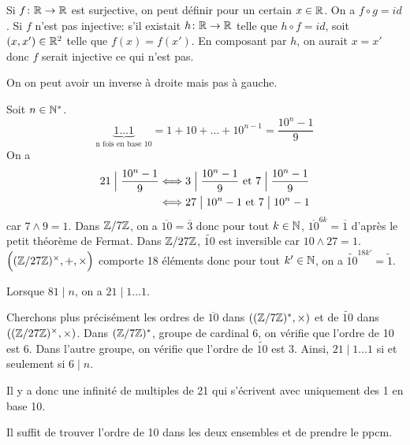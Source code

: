 \begin{remark}
	Si $f\colon\mathbb{R}\to\mathbb{R}$ est surjective, on peut définir  pour un certain $x\in\mathbb{R}$. On a $f\circ g=id$. Si $f$ n'est pas injective: s'il existait $h\colon\mathbb{R}\to\mathbb{R}$ telle que $h\circ f=id$, soit $(x,x')\in \mathbb{R}^{2}$ telle que $f(x)=f(x')$. En composant par $h$, on aurait $x=x'$ donc $f$ serait injective ce qui n'est pas. 

	On on peut avoir un inverse à droite mais pas à gauche.
\end{remark}

\begin{solution}
	Soit $n\in\mathbb{N}^{*}$.
	$$\underbrace{1\dots 1}_{\text{n fois en base 10}}=1+10+\dots+10^{n-1}=\frac{10^{n}-1}{9}$$
	On a 
	\begin{align*}
		21\Bigm|\frac{10^{n}-1}{9}
		&\Longleftrightarrow 3\Bigm|\frac{10^{n}-1}{9}\text{ et }7\Bigm|\frac{10^{n}-1}{9}\\
		&\Longleftrightarrow 27\bigm|10^{n}-1\text{ et }7\bigm| 10^{n}-1
	\end{align*}
	car $7\wedge 9=1$.
	Dans $\mathbb{Z}/7\mathbb{Z}$, on a $\overline{10}=\overline{3}$ donc pour tout $k\in\mathbb{N}$, $\overline{10}^{6k}=\overline{1}$ d'après le petit théorème de Fermat. Dans $\mathbb{Z}/27\mathbb{Z}$, $\widetilde{10}$ est inversible car $10\wedge 27=1$. $\Bigl((\mathbb{Z}/27\mathbb{Z})^{\times},+,\times\Bigr)$ comporte 18 éléments donc pour tout $k'\in\mathbb{N}$, on a $\widetilde{10}^{18k'}=\widetilde{1}$.

	Lorsque $81\mid n$, on a $21\mid 1\dots 1$. 
	
	Cherchons plus précisément les ordres de $\overline{10}$ dans $((\mathbb{Z}/7\mathbb{Z})^{*},\times)$ et de $\widetilde{10}$ dans $((\mathbb{Z}/27\mathbb{Z})^{\times},\times)$.
	Dans $(\mathbb{Z}/7\mathbb{Z})^{*}$, groupe de cardinal 6, on vérifie que l'ordre de 10 est 6. Dans l'autre groupe, on vérifie que l'ordre de $\widetilde{10}$ est 3. Ainsi, $21\mid 1\dots 1$ si et seulement si $6\mid n$.

	Il y a donc une infinité de multiples de 21 qui s'écrivent avec uniquement des 1 en base 10.
\end{solution}

\begin{remark}
	Il suffit de trouver l'ordre de 10 dans les deux ensembles et de prendre le ppcm.
\end{remark}


